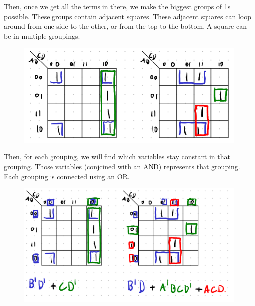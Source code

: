 \documentclass[12pt,letterpaper]{article} \usepackage{amsmath} \usepackage{graphicx}  \usepackage{longtable}  \usepackage{amssymb}
\begin{document}
        Then, once we get all the terms in there, we make the biggest groups of 1s possible. These groups contain adjacent squares. These adjacent squares can loop around from one side to the other, or from the top to the bottom. A square can be in multiple groupings.

        \begin{figure}[H]
            \centering
            \includegraphics[width=0.6\linewidth]{k2.png}
        \end{figure}

        Then, for each grouping, we will find which variables stay constant in that grouping. Those variables (conjoined with an AND) represents that grouping. Each grouping is connected using an OR. 

        \begin{figure}[H]
            \centering
            \includegraphics[width=0.6\linewidth]{k3.png}
        \end{figure}
\end{document}
